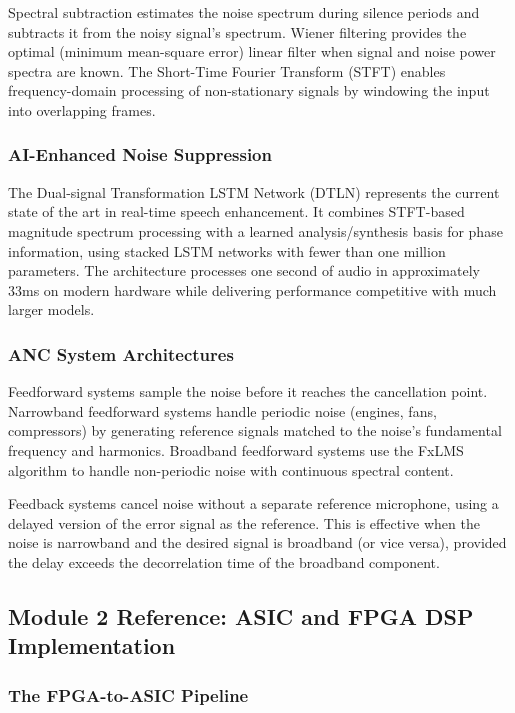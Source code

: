 \documentclass[11pt,letterpaper]{article}
\begin{document}
Spectral subtraction estimates the noise spectrum during silence periods and subtracts it from the noisy signal's spectrum. Wiener filtering provides the optimal (minimum mean-square error) linear filter when signal and noise power spectra are known. The Short-Time Fourier Transform (STFT) enables frequency-domain processing of non-stationary signals by windowing the input into overlapping frames.

\subsubsection{AI-Enhanced Noise Suppression}

The Dual-signal Transformation LSTM Network (DTLN) represents the current state of the art in real-time speech enhancement. It combines STFT-based magnitude spectrum processing with a learned analysis/synthesis basis for phase information, using stacked LSTM networks with fewer than one million parameters. The architecture processes one second of audio in approximately 33ms on modern hardware while delivering performance competitive with much larger models.

\subsubsection{ANC System Architectures}

Feedforward systems sample the noise before it reaches the cancellation point. Narrowband feedforward systems handle periodic noise (engines, fans, compressors) by generating reference signals matched to the noise's fundamental frequency and harmonics. Broadband feedforward systems use the FxLMS algorithm to handle non-periodic noise with continuous spectral content.

Feedback systems cancel noise without a separate reference microphone, using a delayed version of the error signal as the reference. This is effective when the noise is narrowband and the desired signal is broadband (or vice versa), provided the delay exceeds the decorrelation time of the broadband component.

\subsection{Module 2 Reference: ASIC and FPGA DSP Implementation}

\subsubsection{The FPGA-to-ASIC Pipeline}
\end{document}

